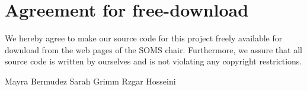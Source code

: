 
\section*{Agreement for free-download}
\bigskip


\bigskip


\large We hereby agree to make our source code for this project freely available for download from the web pages of the SOMS chair. Furthermore, we assure that all source code is written by ourselves and is not violating any copyright restrictions.


\begin{center}
\vspace{3cm}
Mayra Bermudez \hspace{3cm} Sarah Grimm \hspace{3cm} Rzgar Hosseini

\end{center}
